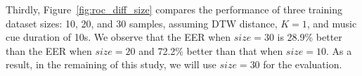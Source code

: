 Thirdly, Figure~\ref{fig:roc_diff_size} compares the performance of three training dataset sizes: 10, 20, and 30 samples, assuming DTW distance, $K=1$, and music cue duration of 10s. We observe that the EER when $size=30$ is 28.9\% better than the EER when $size=20$ and 72.2\% better than that when $size=10$. As a result, in the remaining of this study, we will use $size=30$ for the evaluation.




